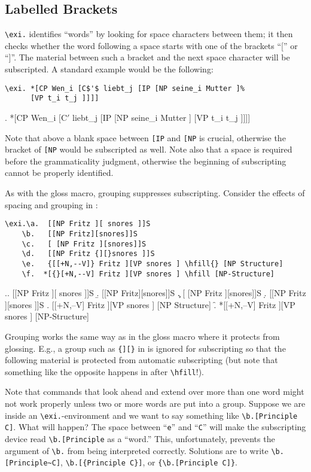 \documentclass{article}
\begin{document}
\subsection*{Labelled Brackets}%
 \verb-\exi.- identifies ``words'' by looking for space characters 
 between them; it then checks whether the word following a space 
 starts with one of the brackets ``['' or ``]''.  The material between 
 such a bracket and the next space character will be subscripted.  A 
 standard example would be the following:
\begin{verbatim}
\exi. *[CP Wen_i [C$'$ liebt_j [IP [NP seine_i Mutter ]%
      [VP t_i t_j ]]]]
\end{verbatim}
\exi.  *[CP Wen_i [C$'$ liebt_j [IP [NP seine_i Mutter ]%
       [VP t_i t_j ]]]]

Note that above a blank space between {\tt [IP} and {\tt [NP} is 
crucial, otherwise the bracket of {\tt [NP} would be subscripted as 
well.  Note also that a space is required before the grammaticality 
judgment, otherwise the beginning of subscripting cannot be properly 
identified.

As with the gloss macro, grouping suppresses subscripting. 
Consider  the effects of spacing and grouping in \Next:
\begin{verbatim}
\exi.\a.  [[NP Fritz ][ snores ]]S
    \b.   [[NP Fritz][snores]]S
    \c.   [ [NP Fritz ][snores]]S
    \d.   [[NP Fritz {][}snores ]]S
    \e.   {[[+N,--V]} Fritz ][VP snores ] \hfill{} [NP Structure]
    \f.  *[{}[+N,--V] Fritz ][VP snores ] \hfill [NP-Structure]
\end{verbatim}       
\exi.\a.   [[NP Fritz ][ snores ]]S
    \b.       [[NP Fritz][snores]]S
    \c.       [ [NP Fritz ][snores]]S
    \d.       [[NP Fritz {][}snores ]]S
    \e.     {[[+N,--V]} Fritz ][VP snores ] \hfill{} [NP Structure]
    \f.   *[{}[+N,--V] Fritz ][VP snores ] \hfill [NP-Structure]
           
Grouping works the same way as in the gloss macro where it protects 
from glossing.  E.g., a group such as \verb.{][}.  in \Last[d] is 
ignored for subscripting so that the following material is protected 
from automatic subscripting (but note that something like the opposite 
happens in \Last[e] after \verb|\hfill|!).

Note that commands that look ahead and extend over more than one word 
might not work properly unless two or more words are put into a group.  
Suppose we are inside an \verb-\exi.--environment and we want to say 
something like \verb-\b.[Principle C]-.  What will happen?  The space 
between ``\texttt{e}'' and ``\texttt{C}'' will make the subscripting 
device read \verb-\b.[Principle- as a ``word.''  This, unfortunately, 
prevents the argument of \verb-\b.- from being interpreted correctly.  
Solutions are to write \verb-\b.[Principle~C]-, \verb-\b.[{Principle C}]-, 
or \verb-{\b.[Principle C]}-.
\end{document}
